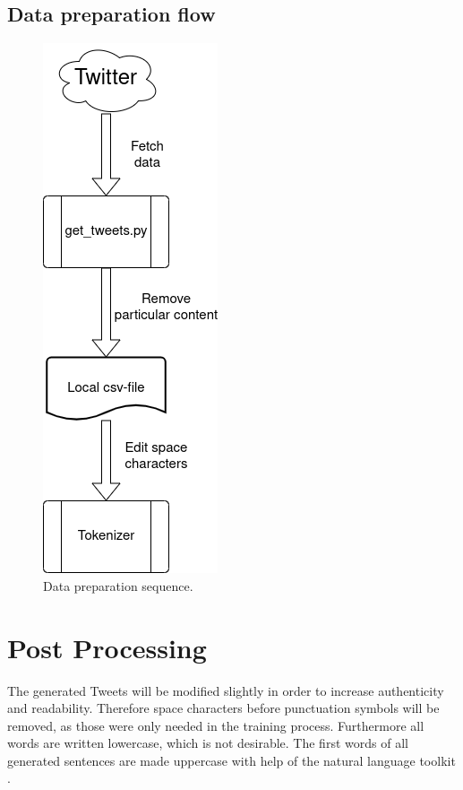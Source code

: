 \documentclass[conference]{IEEEtran}
\begin{document}
\subsection{Data preparation flow}

\begin{figure}[htbp]
\centerline{\includegraphics[scale=0.65]{pictures/data_flow_diagram.png}}
\caption{Data preparation sequence.}
\label{fig:data_preparation}
\end{figure}

\section{Post Processing}

The generated Tweets will be modified slightly in order to increase authenticity and readability. Therefore space characters before punctuation symbols will be removed, as those were only needed in the training process. Furthermore all words are written lowercase, which is not desirable. The first words of all generated sentences are made uppercase with help of the natural language toolkit \cite{nltk}.
\end{document}
